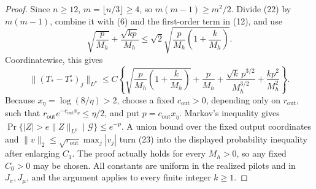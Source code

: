 \documentclass{article}
\begin{document}
\begin{proof}
Since \(n\ge12\), \(m=\lfloor n/3\rfloor\ge4\), so \(m(m-1)\ge m^2/2\).  Divide (22) by \(m(m-1)\), combine it with (6) and the first-order term in (12), and use
\[
 \sqrt{\frac p{M_h}}+\frac{\sqrt{kp}}{M_h}
 \le\sqrt2\sqrt{\frac p{M_h}\left(1+\frac{k}{M_h}\right)}.
\]
Coordinatewise, this gives
\[
 \|(T_*-T_*^\circ)_j\|_{L^p}
 \le C\left\{
 \sqrt{\frac p{M_h}\left(1+\frac{k}{M_h}\right)}
 +\frac p{M_h}
 +\frac{\sqrt{k}\,p^{3/2}}{M_h^{3/2}}
 +\frac{kp^2}{M_h^2}\right\}.
\tag{23}
\]
Because \(x_\eta=\log(8/\eta)>2\), choose a fixed \(c_{\mathrm{out}}>0\), depending only on \(r_{\mathrm{out}}\), such that \(r_{\mathrm{out}}e^{-c_{\mathrm{out}}x_\eta}\le\eta/2\), and put \(p=c_{\mathrm{out}}x_\eta\).  Markov's inequality gives \(\Pr\{|Z|>e\|Z\|_{L^p}\mid\mathcal G\}\le e^{-p}\).  A union bound over the fixed output coordinates and \(\|v\|_2\le\sqrt{r_{\mathrm{out}}}\max_j|v_j|\) turn (23) into the displayed probability inequality after enlarging \(C_1\).  The proof actually holds for every \(M_h>0\), so any fixed \(C_0>0\) may be chosen.  All constants are uniform in the realized pilots and in \(J_\pi,J_\mu\), and the argument applies to every finite integer \(k\ge1\).
\end{proof}
\end{document}
